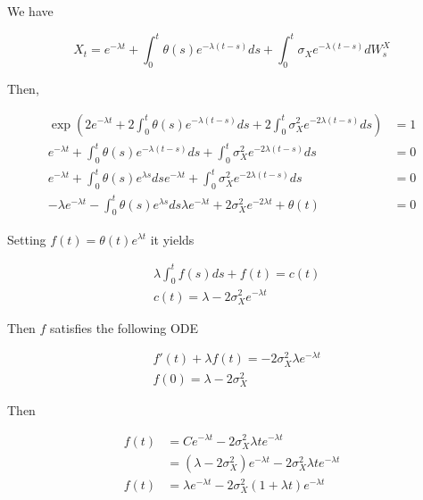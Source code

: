 \documentclass{article}
\begin{document}
\noindent We have 

\begin{equation}
	X_t = e^{-\lambda t} + \int_{0}^t \theta(s) e^{-\lambda (t-s)} ds + \int_0^t \sigma_X e^{-\lambda(t-s)} dW_s^X
\end{equation}

\noindent Then,

\begin{equation*}
\begin{aligned}
	\exp\left(2e^{-\lambda t} + 2\int_{0}^t \theta(s) e^{-\lambda (t-s)} ds + 2\int_0^t \sigma_X^2 e^{-2\lambda(t-s)} ds\right) &= 1\\
	e^{-\lambda t} + \int_{0}^t \theta(s) e^{-\lambda (t-s)} ds + \int_0^t \sigma_X^2 e^{-2\lambda(t-s)} ds &= 0\\
	e^{-\lambda t} + \int_{0}^t \theta(s) e^{\lambda s} ds e^{-\lambda t} + \int_0^t \sigma_X^2 e^{-2\lambda(t-s)} ds &= 0\\
	-\lambda e^{-\lambda t} - \int_{0}^t \theta(s) e^{\lambda s} ds \lambda e^{-\lambda t} + 2 \sigma_X^2 e^{-2\lambda t} + \theta(t) &= 0
\end{aligned}
\end{equation*}

Setting $f(t) = \theta(t) e^{\lambda t}$ it yields

\begin{equation}
\begin{aligned}
	&\lambda \int_0^t f(s) ds + f(t) = c(t)\\
	&c(t) = \lambda - 2\sigma_X^2 e^{-\lambda t}
\end{aligned}
\end{equation}

\noindent Then $f$ satisfies the following ODE

\begin{equation}
\begin{aligned}
	& f'(t) + \lambda f(t) = -2 \sigma_X^2 \lambda e^{-\lambda t}\\
	&f(0) = \lambda - 2\sigma_X^2
\end{aligned}
\end{equation}

\noindent Then

\begin{equation}
\begin{aligned}
	f(t) &= Ce^{-\lambda t} - 2 \sigma_X^2 \lambda t e^{-\lambda t}\\
	&= \left(\lambda - 2\sigma_X^2 \right) e^{-\lambda t} - 2 \sigma_X^2 \lambda t e^{-\lambda t}\\
	f(t) &= \lambda e^{-\lambda t} - 2\sigma_X^2 (1 + \lambda t) e^{-\lambda t}
\end{aligned}
\end{equation}
\end{document}
